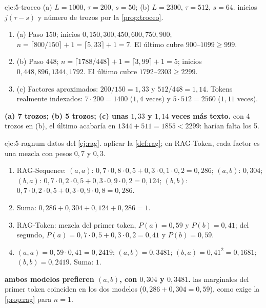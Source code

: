 \begin{solucion}{eje:5-troceo}
\datos (a) $L=1000$, $\tau=200$, $s=50$; (b) $L=2300$, $\tau=512$, $s=64$.
\planteamiento inicios $j(\tau-s)$ y número de trozos por la \cref{prop:troceo}.
\pasos
\begin{enumerate}[label=\arabic*.]
  \item (a) Paso $150$; inicios $0,150,300,450,600,750,900$; $n=\lceil 800/150\rceil+1=\lceil 5{,}33\rceil+1=7$. El último cubre $900$--$1099\ge 999$.
  \item (b) Paso $448$; $n=\lceil 1788/448\rceil+1=\lceil 3{,}99\rceil+1=5$; inicios $0,448,896,1344,1792$. El último cubre $1792$--$2303\ge 2299$.
  \item (c) Factores aproximados: $200/150=1{,}33$ y $512/448=1{,}14$. Tokens realmente indexados: $7\cdot 200=1400$ ($1{,}4$ veces) y $5\cdot 512=2560$ ($1{,}11$ veces).
\end{enumerate}
\resultado \textbf{(a) 7 trozos; (b) 5 trozos; (c) unas $1{,}33$ y $1{,}14$ veces más texto.}
\comprobacion con 4 trozos en (b), el último acabaría en $1344+511=1855<2299$: harían falta los 5.
\end{solucion}

\begin{solucion}{eje:5-ragnum}
\datos datos del \cref{ej:rag}.
\planteamiento aplicar la \cref{def:rag}; en RAG-Token, cada factor es una mezcla con pesos $0{,}7$ y $0{,}3$.
\pasos
\begin{enumerate}[label=\arabic*.]
  \item RAG-Sequence: $(a,a)$: $0{,}7\cdot 0{,}8\cdot 0{,}5+0{,}3\cdot 0{,}1\cdot 0{,}2=0{,}286$; $(a,b)$: $0{,}304$; $(b,a)$: $0{,}7\cdot 0{,}2\cdot 0{,}5+0{,}3\cdot 0{,}9\cdot 0{,}2=0{,}124$; $(b,b)$: $0{,}7\cdot 0{,}2\cdot 0{,}5+0{,}3\cdot 0{,}9\cdot 0{,}8=0{,}286$.
  \item Suma: $0{,}286+0{,}304+0{,}124+0{,}286=1$.
  \item RAG-Token: mezcla del primer token, $P(a)=0{,}59$ y $P(b)=0{,}41$; del segundo, $P(a)=0{,}7\cdot 0{,}5+0{,}3\cdot 0{,}2=0{,}41$ y $P(b)=0{,}59$.
  \item $(a,a)=0{,}59\cdot 0{,}41=0{,}2419$; $(a,b)=0{,}3481$; $(b,a)=0{,}41^{2}=0{,}1681$; $(b,b)=0{,}2419$. Suma: $1$.
\end{enumerate}
\resultado \textbf{ambos modelos prefieren $(a,b)$, con $0{,}304$ y $0{,}3481$.}
\comprobacion las marginales del primer token coinciden en los dos modelos ($0{,}286+0{,}304=0{,}59$), como exige la \cref{prop:rag} para $n=1$.
\end{solucion}

